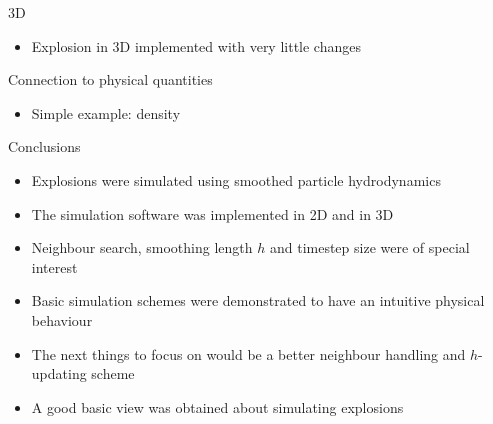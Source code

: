 \documentclass{beamer}
\begin{document}
\begin{frame}{3D}
\begin{itemize}

\item Explosion in 3D implemented with very little changes

\end{itemize}
\end{frame}

\begin{frame}{Connection to physical quantities}
\begin{itemize}

\item Simple example: density

\end{itemize}
\end{frame}

\begin{frame}{Conclusions}
\begin{itemize}

\item Explosions were simulated using smoothed particle hydrodynamics
\item The simulation software was implemented in 2D and in 3D
\item Neighbour search, smoothing length $h$ and timestep size were of special interest
\item Basic simulation schemes were demonstrated to have an intuitive physical behaviour
\item The next things to focus on would be a better neighbour handling and $h$-updating scheme
\item A good basic view was obtained about simulating explosions

\end{itemize}
\end{frame}
\end{document}
